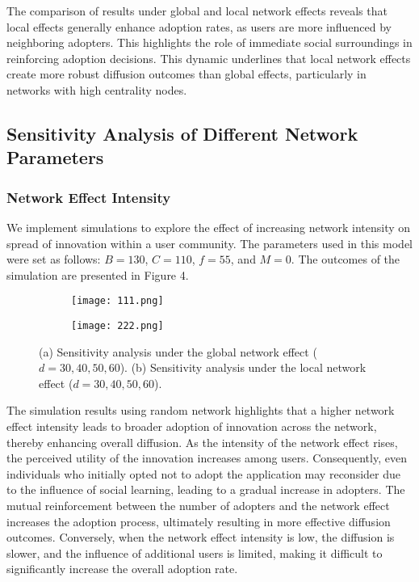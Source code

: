 \documentclass{article} %
\begin{document}
The comparison of results under global and local network effects reveals that local effects generally enhance adoption rates, as users are more influenced by neighboring adopters. This highlights the role of immediate social surroundings in reinforcing adoption decisions. This dynamic underlines that local network effects create more robust diffusion outcomes than global effects, particularly in networks with high centrality nodes.

\subsection{Sensitivity Analysis of Different Network Parameters}

\subsubsection{Network Effect Intensity}

We implement simulations to explore the effect of increasing network intensity on spread of innovation within a user community. The parameters used in this model were set as follows: \( B = 130 \), \( C = 110 \), \( f = 55 \), and \( M = 0 \). The outcomes of the simulation are presented in Figure 4.
\begin{figure}[h]
    \centering
    \begin{subfigure}{0.42\textwidth}
        \centering
        \texttt{[image: 111.png]} %
        \caption{}
        \label{fig:sensitivity_global}
    \end{subfigure}
    \hspace{0.05\textwidth} %
    \begin{subfigure}{0.42\textwidth}
        \centering
        \texttt{[image: 222.png]} %
        \caption{}
        \label{fig:sensitivity_local}
    \end{subfigure}
    
    \caption{(a) Sensitivity analysis under the global network effect (\( d = 30, 40, 50, 60 \)). (b) Sensitivity analysis under the local network effect (\( d = 30, 40, 50, 60 \)).}
    \label{fig:sensitivity_analysis}
\end{figure}
The simulation results using random network highlights that a higher network effect intensity leads to broader adoption of innovation across the network, thereby enhancing overall diffusion. As the intensity of the network effect rises, the perceived utility of the innovation increases among users. Consequently, even individuals who initially opted not to adopt the application may reconsider due to the influence of social learning, leading to a gradual increase in adopters. The mutual reinforcement between the number of adopters and the network effect increases the adoption process, ultimately resulting in more effective diffusion outcomes. Conversely, when the network effect intensity is low, the diffusion is slower, and the influence of additional users is limited, making it difficult to significantly increase the overall adoption rate.
\end{document}
